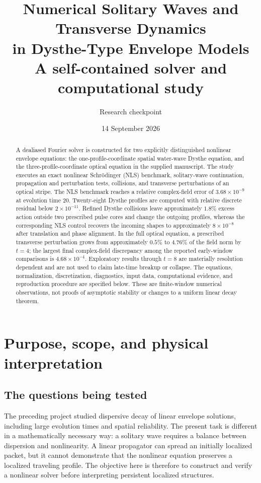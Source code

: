 \documentclass[10pt,letterpaper]{article}
\title{Numerical Solitary Waves and Transverse Dynamics\\in Dysthe-Type Envelope Models\\[6pt]\large A self-contained solver and computational study}
\author{Research checkpoint}
\date{14 September 2026}
\numberwithin{equation}{section}
\begin{document}
\maketitle
\begin{abstract}
A dealiased Fourier solver is constructed for two explicitly distinguished nonlinear envelope equations: the one-profile-coordinate spatial water-wave Dysthe equation, and the three-profile-coordinate optical equation in the supplied manuscript. The study executes an exact nonlinear Schr\"odinger (NLS) benchmark, solitary-wave continuation, propagation and perturbation tests, collisions, and transverse perturbations of an optical stripe. The NLS benchmark reaches a relative complex-field error of $3.68\times10^{-9}$ at evolution time $20$. Twenty-eight Dysthe profiles are computed with relative discrete residual below $2\times10^{-11}$. Refined Dysthe collisions leave approximately $1.8\%$ excess action outside two prescribed pulse cores and change the outgoing profiles, whereas the corresponding NLS control recovers the incoming shapes to approximately $8\times10^{-8}$ after translation and phase alignment. In the full optical equation, a prescribed transverse perturbation grows from approximately $0.5\%$ to $4.76\%$ of the field norm by $t=4$; the largest final complex-field discrepancy among the reported early-window comparisons is $4.68\times10^{-4}$. Exploratory results through $t=8$ are materially resolution dependent and are not used to claim late-time breakup or collapse. The equations, normalization, discretization, diagnostics, input data, computational evidence, and reproduction procedure are specified below. These are finite-window numerical observations, not proofs of asymptotic stability or changes to a uniform linear decay theorem.
\end{abstract}
\tableofcontents
\clearpage

\section{Purpose, scope, and physical interpretation}
\subsection{The questions being tested}
The preceding project studied dispersive decay of linear envelope solutions, including large evolution times and spatial reliability. The present task is different in a mathematically necessary way: a solitary wave requires a balance between dispersion and nonlinearity. A linear propagator can spread an initially localized packet, but it cannot demonstrate that the nonlinear equation preserves a localized traveling profile. The objective here is therefore to construct and verify a nonlinear solver before interpreting persistent localized structures.
\end{document}
